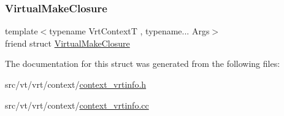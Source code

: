 \subsubsection{\texorpdfstring{Virtual\+Make\+Closure}{VirtualMakeClosure}}
{\footnotesize\ttfamily template$<$typename Vrt\+ContextT , typename... Args$>$ \\
friend struct \hyperlink{structvt_1_1vrt_1_1_virtual_make_closure}{Virtual\+Make\+Closure}\hspace{0.3cm}{\ttfamily [friend]}}



The documentation for this struct was generated from the following files\+:\begin{DoxyCompactItemize}
\item 
src/vt/vrt/context/\hyperlink{context__vrtinfo_8h}{context\+\_\+vrtinfo.\+h}\item 
src/vt/vrt/context/\hyperlink{context__vrtinfo_8cc}{context\+\_\+vrtinfo.\+cc}\end{DoxyCompactItemize}
